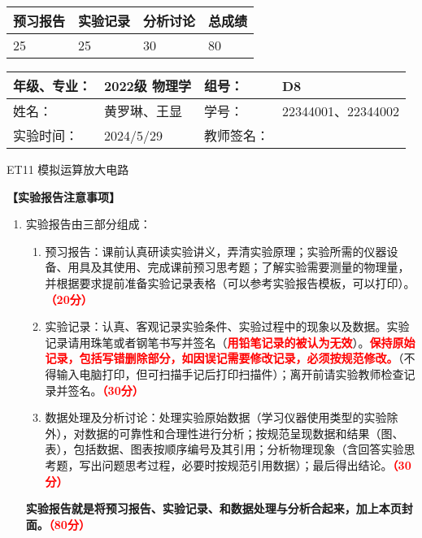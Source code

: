 \documentclass[dvipsnames, svgnames,a4paper,11pt]{article}
\begin{document}
	
	\begin{table}
		\renewcommand\arraystretch{1.7}
		\begin{tabularx}{\textwidth}{
				|X|X|X|X
				|X|X|X|X|}
			\hline
			\multicolumn{2}{|c|}{预习报告}&\multicolumn{2}{|c|}{实验记录}&\multicolumn{2}{|c|}{分析讨论}&\multicolumn{2}{|c|}{总成绩}\\
			\hline
			\LARGE25 & & \LARGE25 & & \LARGE30 & & \LARGE80 & \\
			\hline
		\end{tabularx}
	\end{table}
	
	\begin{table}
		\renewcommand\arraystretch{1.7}
		\begin{tabularx}{\textwidth}{|X|X|X|X|}
			\hline
			年级、专业： & 2022级 物理学 &组号： & D8\\
			\hline
			姓名： &  黄罗琳、王显 & 学号： &22344001、22344002   \\
			\hline
			实验时间： & 2024/5/29 & 教师签名： & \\
			\hline
		\end{tabularx}
	\end{table}
	
	\begin{center}
		\LARGE ET11 \quad 模拟运算放大电路
	\end{center}
	
	
	\textbf{【实验报告注意事项】}
	\begin{enumerate}
		\item 实验报告由三部分组成：
		\begin{enumerate}
			\item 预习报告：课前认真研读实验讲义，弄清实验原理；实验所需的仪器设备、用具及其使用、完成课前预习思考题；了解实验需要测量的物理量，并根据要求提前准备实验记录表格（可以参考实验报告模板，可以打印）。\textcolor{red}{\textbf{（20分）}}
			\item 实验记录：认真、客观记录实验条件、实验过程中的现象以及数据。实验记录请用珠笔或者钢笔书写并签名（\textcolor{red}{\textbf{用铅笔记录的被认为无效}}）。\textcolor{red}{\textbf{保持原始记录，包括写错删除部分，如因误记需要修改记录，必须按规范修改。}}（不得输入电脑打印，但可扫描手记后打印扫描件）；离开前请实验教师检查记录并签名。\textcolor{red}{\textbf{（30分）}}
			\item 数据处理及分析讨论：处理实验原始数据（学习仪器使用类型的实验除外），对数据的可靠性和合理性进行分析；按规范呈现数据和结果（图、表），包括数据、图表按顺序编号及其引用；分析物理现象（含回答实验思考题，写出问题思考过程，必要时按规范引用数据）；最后得出结论。\textcolor{red}{\textbf{（30分）}}
		\end{enumerate}
		\textbf{实验报告就是将预习报告、实验记录、和数据处理与分析合起来，加上本页封面。\textcolor{red}{（80分）}}
	
	\end{enumerate}
	
\end{document}
